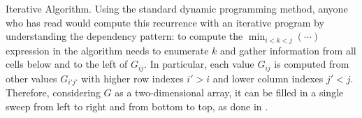 \begin{paragraph}{Iterative Algorithm.}
Using the standard dynamic programming method, anyone who has  read \cite{09/CLRS} would compute this recurrence
with an iterative program by understanding the dependency pattern:
to compute the $\min_{i<k<j}(\cdots)$ expression in 
the algorithm needs to enumerate $k$ and gather information from all cells below and to the left of $G_{ij}$.
In particular, each value $G_{ij}$ is computed from other values $G_{i'j'}$ with higher
row indexes $i'>i$ and lower column indexes $j'<j$. 
Therefore, considering $G$ as a two-dimensional array, it can be filled in a single sweep from left to right and from bottom
to top, as done in .
\end{paragraph}




\newcommand\qbox[1]{\fbox{\rm\scriptsize#1}}
\newcommand\tinyqbox[1]{\hspace{.5pt}\tikz \node[draw,inner sep=1.5pt] {$\scriptscriptstyle #1$};}

\newcommand\plusoneocd{\raisebox{.5pt}{$\scriptstyle+1$}}


